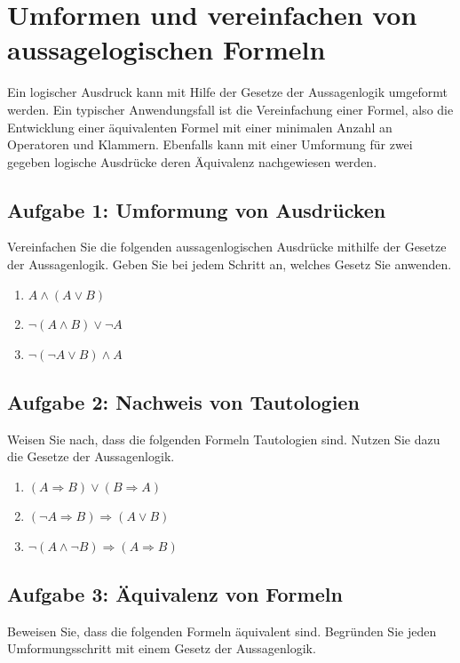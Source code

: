\documentclass[ngerman,11pt]{article}
\begin{document}
\newpage
\section*{Umformen und vereinfachen von aussagelogischen Formeln}

Ein logischer Ausdruck kann mit Hilfe der Gesetze der Aussagenlogik umgeformt werden. Ein typischer Anwendungsfall ist die Vereinfachung einer Formel, also die Entwicklung einer äquivalenten Formel mit einer minimalen Anzahl an Operatoren und Klammern. Ebenfalls kann mit einer Umformung für zwei gegeben logische Ausdrücke deren Äquivalenz nachgewiesen werden.

\subsection*{Aufgabe 1: Umformung von Ausdrücken}
Vereinfachen Sie die folgenden aussagenlogischen Ausdrücke mithilfe der Gesetze der Aussagenlogik. Geben Sie bei jedem Schritt an, welches Gesetz Sie anwenden.

\begin{enumerate}[label=\alph*)]
\item $A \wedge (A \vee B)$
\item $\neg (A \wedge B) \vee \neg A$
\item $\neg (\neg A \vee B) \wedge A$
\end{enumerate}

\subsection*{Aufgabe 2: Nachweis von Tautologien}
Weisen Sie nach, dass die folgenden Formeln Tautologien sind. Nutzen Sie dazu die Gesetze der Aussagenlogik.

\begin{enumerate}[label=\alph*)]
\item $(A \Rightarrow B) \vee (B \Rightarrow A)$
\item $(\neg A \Rightarrow B) \Rightarrow (A \vee B)$
\item $\neg (A \wedge \neg B) \Rightarrow (A \Rightarrow B)$
\end{enumerate}

\subsection*{Aufgabe 3: Äquivalenz von Formeln}
Beweisen Sie, dass die folgenden Formeln äquivalent sind. Begründen Sie jeden Umformungsschritt mit einem Gesetz der Aussagenlogik.
\end{document}
